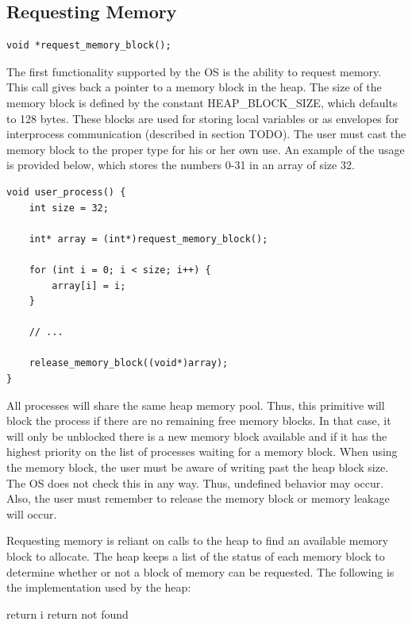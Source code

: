 \documentclass[12pt]{report}
\begin{document}
\subsection{Requesting Memory}
\label{sec:request_memory}
\begin{lstlisting}
void *request_memory_block();
\end{lstlisting}
\par The first functionality supported by the OS is the ability to request memory. This call gives back a pointer to a memory block in the heap. The size of the memory block is defined by the constant HEAP\_BLOCK\_SIZE, which defaults to 128 bytes. These blocks are used for storing local variables or as envelopes for interprocess communication (described in section TODO). The user must cast the memory block to the proper type for his or her own use. An example of the usage is provided below, which stores the numbers 0-31 in an array of size 32.
\begin{lstlisting}
void user_process() {
    int size = 32;

    int* array = (int*)request_memory_block();

    for (int i = 0; i < size; i++) {
        array[i] = i;
    }

    // ...

    release_memory_block((void*)array);
}
\end{lstlisting}

\par All processes will share the same heap memory pool. Thus, this primitive will block the process if there are no remaining free memory blocks. In that case, it will only be unblocked there is a new memory block available and if it has the highest priority on the list of processes waiting for a memory block. When using the memory block, the user must be aware of writing past the heap block size. The OS does not check this in any way. Thus, undefined behavior may occur. Also, the user must remember to release the memory block or memory leakage will occur.

\par Requesting memory is reliant on calls to the heap to find an available memory block to allocate. The heap keeps a list of the status of each memory block to determine whether or not a block of memory can be requested. The following is the implementation used by the heap:
\begin{algorithmic}
        \State return i
      \EndIf
    \EndFor
  \State return not found
  \EndFunction
\end{algorithmic}
\end{document}
